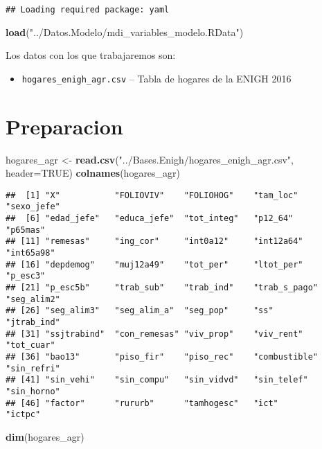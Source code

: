 \documentclass[11pt,]{article}
\newenvironment{Shaded}{\begin{snugshade}}{\end{snugshade}}
\newcommand{\KeywordTok}[1]{\textcolor[rgb]{0.13,0.29,0.53}{\textbf{#1}}}
\newcommand{\DataTypeTok}[1]{\textcolor[rgb]{0.13,0.29,0.53}{#1}}
\newcommand{\StringTok}[1]{\textcolor[rgb]{0.31,0.60,0.02}{#1}}
\newcommand{\OtherTok}[1]{\textcolor[rgb]{0.56,0.35,0.01}{#1}}
\newcommand{\NormalTok}[1]{#1}
\providecommand{\tightlist}{%
\setlength{\itemsep}{0pt}\setlength{\parskip}{0pt}}
\begin{document}
\begin{verbatim}
## Loading required package: yaml
\end{verbatim}

\begin{Shaded}
\begin{Highlighting}[]
\KeywordTok{load}\NormalTok{(}\StringTok{"../Datos.Modelo/mdi_variables_modelo.RData"}\NormalTok{)}
\end{Highlighting}
\end{Shaded}

Los datos con los que trabajaremos son:

\begin{itemize}
\tightlist
\item
  \texttt{hogares\_enigh\_agr.csv} -- Tabla de hogares de la ENIGH 2016
\end{itemize}

\section{Preparacion}\label{preparacion}

\begin{Shaded}
\begin{Highlighting}[]
\NormalTok{hogares_agr <-}\StringTok{ }\KeywordTok{read.csv}\NormalTok{(}\StringTok{"../Bases.Enigh/hogares_enigh_agr.csv"}\NormalTok{, }\DataTypeTok{header=}\OtherTok{TRUE}\NormalTok{)}
\KeywordTok{colnames}\NormalTok{(hogares_agr)}
\end{Highlighting}
\end{Shaded}

\begin{verbatim}
##  [1] "X"           "FOLIOVIV"    "FOLIOHOG"    "tam_loc"     "sexo_jefe"  
##  [6] "edad_jefe"   "educa_jefe"  "tot_integ"   "p12_64"      "p65mas"     
## [11] "remesas"     "ing_cor"     "int0a12"     "int12a64"    "int65a98"   
## [16] "depdemog"    "muj12a49"    "tot_per"     "ltot_per"    "p_esc3"     
## [21] "p_esc5b"     "trab_sub"    "trab_ind"    "trab_s_pago" "seg_alim2"  
## [26] "seg_alim3"   "seg_alim_a"  "seg_pop"     "ss"          "jtrab_ind"  
## [31] "ssjtrabind"  "con_remesas" "viv_prop"    "viv_rent"    "tot_cuar"   
## [36] "bao13"       "piso_fir"    "piso_rec"    "combustible" "sin_refri"  
## [41] "sin_vehi"    "sin_compu"   "sin_vidvd"   "sin_telef"   "sin_horno"  
## [46] "factor"      "rururb"      "tamhogesc"   "ict"         "ictpc"
\end{verbatim}

\begin{Shaded}
\begin{Highlighting}[]
\KeywordTok{dim}\NormalTok{(hogares_agr)}
\end{Highlighting}
\end{Shaded}
\end{document}
